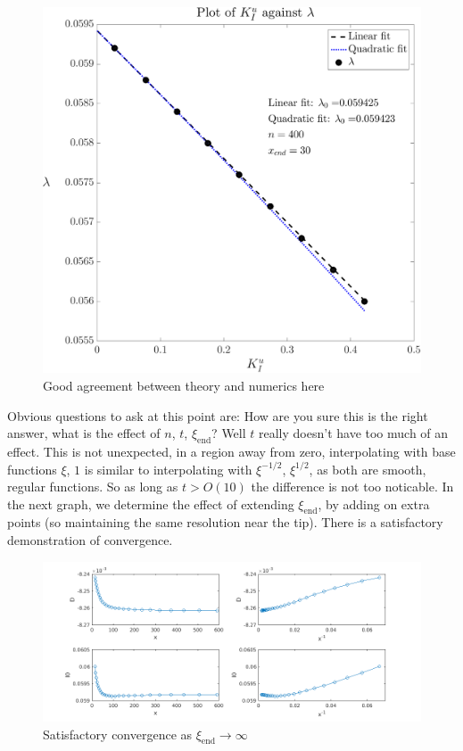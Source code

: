 \documentclass{jfm}
\begin{document}
\begin{figure}
  \centerline{\includegraphics[scale=0.3]{./../../Graphs/l0.pdf}}
  \caption{Good agreement between theory and numerics here}
\end{figure}

Obvious questions to ask at this point are: How are you sure this is the right
answer, what is the effect of $n$, $t$, $\xi_{\mathrm{end}}$? Well $t$ really
doesn't have too much of an effect. This is not unexpected, in a region away
from zero, interpolating with base functions $\xi$, $1$ is similar to 
interpolating with $\xi^{-1/2}$, $\xi^{1/2}$, as both are smooth, regular 
functions. So as long as $t > O(10)$ the difference is not too noticable.
In the next graph, we determine the effect of extending $\xi_{\mathrm{end}}$,
by adding on extra points (so maintaining the same resolution near the tip).
There is a satisfactory demonstration of convergence.
\begin{figure}
  \centerline{\includegraphics[scale=0.5]{./../../Graphs/xend-march.png}}
  \caption{Satisfactory convergence as $\xi_{\mathrm{end}} \to \infty$}
\end{figure}
\end{document}

